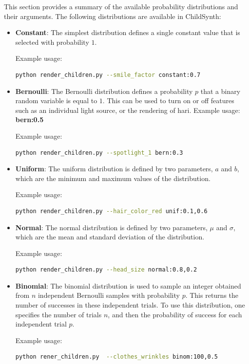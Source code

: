 \documentclass{article}
\begin{document}
This section provides a summary of the available probability distributions and their arguments. The following distributions are available in ChildSynth:

\begin{itemize}

    \item {\textbf{Constant}: The simplest distribution defines a single constant value that is selected with probability $1$.}
    
    Example usage:
    \begin{lstlisting}[language=bash]
        python render_children.py --smile_factor constant:0.7 \end{lstlisting}
    
    \item \textbf{Bernoulli}: The Bernoulli distribution defines a probability $p$ that a binary random variable is equal to $1$. This can be used to turn on or off features such as an individual light source, or the rendering of hari. Example usage: \textbf{bern:0.5} 
    
    Example usage:
    \begin{lstlisting}[language=bash]
        python render_children.py --spotlight_1 bern:0.3\end{lstlisting}
   
    \item \textbf{Uniform}: The uniform distribution is defined by two parameters, $a$ and $b$, which are the minimum and maximum values of the distribution. 
    
    Example usage:
    \begin{lstlisting}[language=bash]
        python render_children.py --hair_color_red unif:0.1,0.6\end{lstlisting}
    
    \item \textbf{Normal}: The normal distribution is defined by two parameters, $\mu$ and $\sigma$, which are the mean and standard deviation of the distribution.
    
    Example usage:
    \begin{lstlisting}[language=bash]
        python render_children.py --head_size normal:0.8,0.2\end{lstlisting}
    
    \item \textbf{Binomial}: The binomial distribution is used to sample an integer obtained from $n$ independent Bernoulli samples with probability $p$. This returns the number of successes in these independent trials. To use this distribution, one specifies the number of trials $n$, and then the probability of success for each independent trial $p$. 
    
    Example usage:
        \begin{lstlisting}[language=bash]
        python rener_children.py  --clothes_wrinkles binom:100,0.5\end{lstlisting}

        
\end{itemize}
\end{document}
